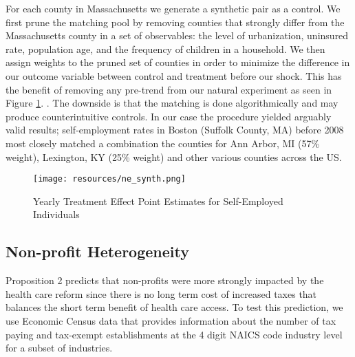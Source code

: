 \documentclass[12pt]{article}
\begin{document}
For each county in Massachusetts we generate a synthetic pair as a control. We first prune the matching pool by removing counties that strongly differ from the Massachusetts county in a set of observables: the level of urbanization, uninsured rate, population age, and the frequency of children in a household. We then assign weights to the pruned set of counties in order to minimize the difference in our outcome variable between control and treatment before our shock. This has the benefit of removing any pre-trend from our natural experiment as seen in Figure \ref{fig:state_contrast}. . The downside is that the matching is done algorithmically and may produce counterintuitive controls. In our case the procedure yielded arguably valid results; self-employment rates in Boston (Suffolk County, MA) before 2008 most closely matched a combination the counties for Ann Arbor, MI (57\% weight), Lexington, KY (25\% weight) and other various counties across the US. 

\begin{figure}[H]
	\centering
	\texttt{[image: resources/ne\_synth.png]}
	\caption{Yearly Treatment Effect Point Estimates for Self-Employed Individuals}
	\label{fig:state_contrast}
\end{figure}

\begin{comment}
\begin{figure}[H]
	\centering
	\begin{subfigure}[b]{0.495\textwidth}
		\texttt{[image: tmp/graphpoint\_diff\_se\_pop\_new\_england]}
		\caption{Other New England states as control}
	\end{subfigure}
		\begin{subfigure}[b]{0.495\textwidth}
		\texttt{[image: tmp/graphpoint\_diff\_se\_pop\_synthetic]}
		\caption{Synthetic control}
	\end{subfigure}
	\caption{Treatment Effect for Self-Employed Individuals}
	\label{fig:state_contrast}
\end{figure}
\end{comment}

\subsection{Non-profit Heterogeneity}

Proposition 2 predicts that non-profits were more strongly impacted by the health care reform since there is no long term cost of increased taxes that balances the short term benefit of health care access. To test this prediction, we use Economic Census data that provides information about the number of tax paying and tax-exempt establishments at the 4 digit NAICS code industry level for a subset of industries.  
\end{document}
